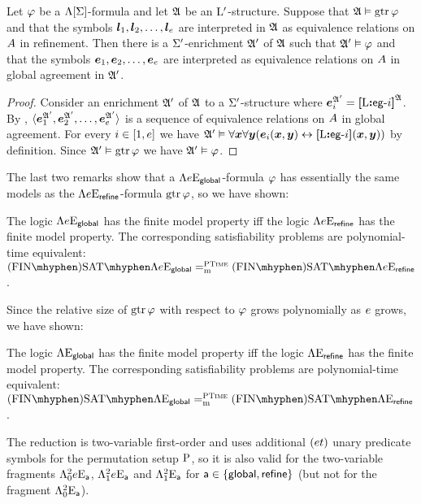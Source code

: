 \begin{remark}\label{rem:global-m-to-e}
Let $\varphi$ be a $\Lambda[\mathrm{\Sigma}]$-formula and let $\mathfrak{A}$ be an
${{\mathrm{L}}'}$-structure.
Suppose that $\mathfrak{A} \vDash \operatorname{gtr}\varphi$ and that the symbols
$\bm{l}_{1},\bm{l}_{2},\dots,\bm{l}_{e}$ are interpreted in $\mathfrak{A}$ as equivalence
relations on $A$ in refinement.
Then there is a $\mathrm{\Sigma'}$-enrichment $\mathfrak{A'}$ of $\mathfrak{A}$ such that
$\mathfrak{A'} \vDash \varphi$ and that the symbols $\bm{e}_{1},\bm{e}_{2},\dots,\bm{e}_{e}$ are
interpreted as equivalence relations on $A$ in global agreement in $\mathfrak{A'}$.
\end{remark}
\begin{proof}
Consider an enrichment $\mathfrak{A'}$ of $\mathfrak{A}$ to a $\mathrm{\Sigma'}$-structure
where $\bm{e}_{i}^{\mathfrak{A'}} = {\bm{[}{\mathrm{L}}\mathord{\bm{:}}\mathsf{eg}{\hbox{-}}i\bm{]}}^{\mathfrak{A}}$.
By ,
$\langle \bm{e}_{1}^{\mathfrak{A'}}, \bm{e}_{2}^{\mathfrak{A'}}, \dots, \bm{e}_{e}^{\mathfrak{A'}} \rangle$
is a sequence of equivalence relations on $A$ in global agreement.
For every $i \in [1,e]$ we have 
$\mathfrak{A'} \vDash \forall\bm{x}\forall\bm{y}(\bm{e}_{i}(\bm{x},\bm{y}) \leftrightarrow
{\bm{[}{\mathrm{L}}\mathord{\bm{:}}\mathsf{eg}{\hbox{-}}i\bm{]}}(\bm{x},\bm{y}))$ by definition.
Since $\mathfrak{A'} \vDash \operatorname{gtr}\varphi$ we have $\mathfrak{A'} \vDash \varphi$.
\end{proof}

The last two remarks show that a $\Lambda{e}\mathrm{E}_{\mathsf{global}}$-formula $\varphi$
has essentially the same models as the $\Lambda{e}\mathrm{E}_{\mathsf{refine}}$-formula
$\operatorname{gtr}\varphi$, so we have shown:
\begin{proposition}\label{prop:global-to-refine-n}
The logic $\Lambda{e}\mathrm{E}_{\mathsf{global}}$ has the finite model property iff
the logic $\Lambda{e}\mathrm{E}_{\mathsf{refine}}$ has the finite model property. 
The corresponding satisfiability problems are polynomial-time equivalent:
$\FinASat\aL\Eea\sze\agglobal \redeq\cP \FinASat\aL\Eea\sze\agrefine$.
\end{proposition}

Since the relative size of $\operatorname{gtr}\varphi$ with respect to $\varphi$ grows
polynomially as $e$ grows, we have shown:
\begin{proposition}\label{prop:global-to-refine}
The logic $\Lambda{{}}\mathrm{E}_{\mathsf{global}}$ has the finite model property iff
the logic $\Lambda{{}}\mathrm{E}_{\mathsf{refine}}$ has the finite model property. 
The corresponding satisfiability problems are polynomial-time equivalent:
$\FinASat\aL\Eea\nosze\agglobal \redeq\cP \FinASat\aL\Eea\nosze\agrefine$.
\end{proposition}

The reduction is two-variable first-order and uses additional $(et)$
unary predicate symbols for the permutation setup ${\mathrm{P}}$, so it is also valid
for the two-variable fragments $\Lambda^{2}_{0}{e}\mathrm{E}_{\mathsf{a}}$, $\Lambda^{2}_{1}{e}\mathrm{E}_{\mathsf{a}}$
and $\Lambda^{2}_{1}{{}}\mathrm{E}_{\mathsf{a}}$ for $\mathsf{a} \in \left\{\mathsf{global}, \mathsf{refine}\right\}$ (but not
for the fragment $\Lambda^{2}_{0}{{}}\mathrm{E}_{\mathsf{a}}$).
